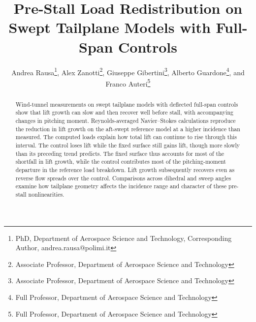 \documentclass[journal]{new-aiaa}
\title{Pre-Stall Load Redistribution on Swept Tailplane Models with Full-Span Controls}
\author{Andrea Rausa\footnote{PhD, Department of Aerospace Science and Technology, Corresponding Author, andrea.rausa@polimi.it},
Alex Zanotti\footnote{Associate Professor, Department of Aerospace Science and Technology}, Giuseppe Gibertini\footnote{Associate Professor, Department of Aerospace Science and Technology}, Alberto Guardone\footnote{Full Professor, Department of Aerospace Science and Technology}, and Franco Auteri\footnote{Full Professor, Department of Aerospace Science and Technology}}
\affil{Politecnico di Milano, Department of Aerospace Science and Technology, Milano, Italy, 20154}
\begin{document}
\maketitle
\begin{abstract}
\label{anchor:abstract}
Wind-tunnel measurements on swept tailplane models with deflected full-span controls show that lift growth can slow and then recover well before stall, with accompanying changes in pitching moment. Reynolds-averaged Navier--Stokes calculations reproduce the reduction in lift growth on the aft-swept reference model at a higher incidence than measured. The computed loads explain how total lift can continue to rise through this interval. The control loses lift while the fixed surface still gains lift, though more slowly than its preceding trend predicts. The fixed surface thus accounts for most of the shortfall in lift growth, while the control contributes most of the pitching-moment departure in the reference load breakdown. Lift growth subsequently recovers even as reverse flow spreads over the control. Comparisons across dihedral and sweep angles examine how tailplane geometry affects the incidence range and character of these pre-stall nonlinearities.
\end{abstract}
\end{document}
